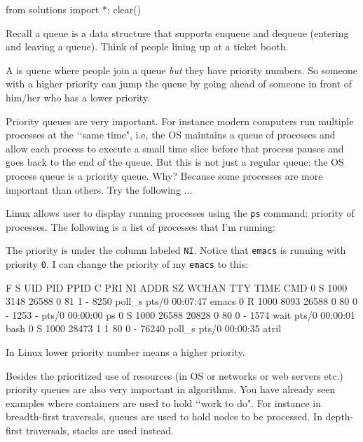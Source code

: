\begin{python0}
from solutions import *; clear()
\end{python0}

Recall a queue is a data structure that supports
enqueue and dequeue (entering and leaving a queue).
Think of people lining up at a ticket booth.

A  is queue where people
join a queue \textit{but}
they have priority numbers.
So someone with a higher priority can jump the queue
by going ahead of someone in front of him/her
who has a lower priority.

Priority queues are very important.
For instance modern computers
run multiple processes at the \lq\lq same time", i.e,
the OS maintains a queue of processes and
allow each process to execute a small time slice
before that process pauses and goes back to the
end of the queue.
But this is not just a regular queue:
the OS process queue is a priority queue.
Why?
Because some processes are more important than others.
Try the following ...

Linux allows user to display running processes using the
\verb!ps! command:
priority of processes.
The following is a list of processes that I'm running:
{\scriptsize
{}
}
The priority is under the column labeled \texttt{NI}.
Notice that \texttt{emacs} is running with priority \texttt{0}.
I can change the priority of my \texttt{emacs} to this:
{\scriptsize
\begin{console}
F S   UID   PID  PPID  C PRI  NI ADDR SZ WCHAN  TTY          TIME CMD
0 S  1000  3148 26588  0  81   1 -  8250 poll_s pts/0    00:07:47 emacs
0 R  1000  8093 26588  0  80   0 -  1253 -      pts/0    00:00:00 ps
0 S  1000 26588 20828  0  80   0 -  1574 wait   pts/0    00:00:01 bash
0 S  1000 28473     1  1  80   0 - 76240 poll_s pts/0    00:00:35 atril
\end{console}
}
In Linux 
lower priority number
means
a higher priority.

Besides the prioritized use of resources 
(in OS or networks or web servers etc.)
priority queues are also very 
important in algorithms.
You have already seen examples where
containers are used to hold \lq\lq work to do".
For instance in breadth-first traversals, queues are used to 
hold nodes to be processed. 
In depth-first traversals, stacks are used instead.

